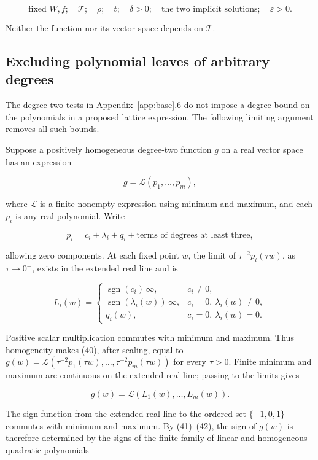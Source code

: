 \documentclass[11pt]{article}
\begin{document}
\[
\text{fixed }W,f;\quad
\mathcal T;\quad\rho;\quad t;\quad\delta>0;\quad
\text{the two implicit solutions};\quad\varepsilon>0.
\tag{39}
\]

Neither the function nor its vector space depends on \(\mathcal T\).

\subsection{Excluding polynomial leaves of arbitrary degrees}

The degree-two tests in Appendix~\ref{app:base}.6 do not impose a degree bound on the
polynomials in a proposed lattice expression. The following limiting
argument removes all such bounds.

Suppose a positively homogeneous degree-two function \(g\) on a real vector
space has an expression

\[
g=\mathcal L(p_1,\ldots,p_m),
\tag{40}
\]

where \(\mathcal L\) is a finite nonempty expression using minimum and
maximum, and each \(p_i\) is any real polynomial. Write

\[
p_i=c_i+\lambda_i+q_i+\text{terms of degrees at least three},
\]

allowing zero components. At each fixed point \(w\), the limit of
\(\tau^{-2}p_i(\tau w)\), as \(\tau\to0^+\), exists in the extended real
line and is

\[
L_i(w)=
\begin{cases}
\operatorname{sgn}(c_i)\,\infty,&c_i\ne0,\\
\operatorname{sgn}(\lambda_i(w))\,\infty,
     &c_i=0,\ \lambda_i(w)\ne0,\\
q_i(w),&c_i=0,\ \lambda_i(w)=0.
\end{cases}
\tag{41}
\]

Positive scalar multiplication commutes with minimum and maximum. Thus
homogeneity makes (40), after scaling, equal to
\(g(w)=\mathcal L(\tau^{-2}p_1(\tau w),\ldots,\tau^{-2}p_m(\tau w))\)
for every \(\tau>0\). Finite minimum and maximum are continuous on the
extended real line; passing to the limits gives

\[
g(w)=\mathcal L(L_1(w),\ldots,L_m(w)).
\tag{42}
\]

The sign function from the extended real line to the ordered set
\(\{-1,0,1\}\) commutes with minimum and maximum. By (41)--(42), the sign
of \(g(w)\) is therefore determined by the signs of the finite family of
linear and homogeneous quadratic polynomials
\end{document}
